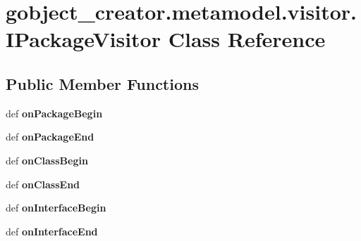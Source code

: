 \hypertarget{classgobject__creator_1_1metamodel_1_1visitor_1_1IPackageVisitor}{
\section{gobject\_\-creator.metamodel.visitor.IPackageVisitor Class Reference}
\label{classgobject__creator_1_1metamodel_1_1visitor_1_1IPackageVisitor}
}
\subsection*{Public Member Functions}
\begin{DoxyCompactItemize}
\item 
\hypertarget{classgobject__creator_1_1metamodel_1_1visitor_1_1IPackageVisitor_af893cb626f2b26b10fd54fcccc0dd76b}{
def {\bfseries onPackageBegin}}
\label{classgobject__creator_1_1metamodel_1_1visitor_1_1IPackageVisitor_af893cb626f2b26b10fd54fcccc0dd76b}

\item 
\hypertarget{classgobject__creator_1_1metamodel_1_1visitor_1_1IPackageVisitor_a316392ddc4f422b55328a25c7780d421}{
def {\bfseries onPackageEnd}}
\label{classgobject__creator_1_1metamodel_1_1visitor_1_1IPackageVisitor_a316392ddc4f422b55328a25c7780d421}

\item 
\hypertarget{classgobject__creator_1_1metamodel_1_1visitor_1_1IPackageVisitor_acf903a32ef0649b62ddb40cdac6473b1}{
def {\bfseries onClassBegin}}
\label{classgobject__creator_1_1metamodel_1_1visitor_1_1IPackageVisitor_acf903a32ef0649b62ddb40cdac6473b1}

\item 
\hypertarget{classgobject__creator_1_1metamodel_1_1visitor_1_1IPackageVisitor_aed883cd231486c4a47abde8d28201fc2}{
def {\bfseries onClassEnd}}
\label{classgobject__creator_1_1metamodel_1_1visitor_1_1IPackageVisitor_aed883cd231486c4a47abde8d28201fc2}

\item 
\hypertarget{classgobject__creator_1_1metamodel_1_1visitor_1_1IPackageVisitor_a6ed3b17eb72dc54a7b578118fc1eb087}{
def {\bfseries onInterfaceBegin}}
\label{classgobject__creator_1_1metamodel_1_1visitor_1_1IPackageVisitor_a6ed3b17eb72dc54a7b578118fc1eb087}

\item 
\hypertarget{classgobject__creator_1_1metamodel_1_1visitor_1_1IPackageVisitor_a57d82924ae61f3bad079376e5ccdd10c}{
def {\bfseries onInterfaceEnd}}
\label{classgobject__creator_1_1metamodel_1_1visitor_1_1IPackageVisitor_a57d82924ae61f3bad079376e5ccdd10c}


\end{DoxyCompactItemize}
